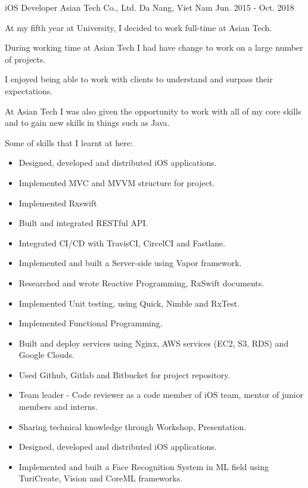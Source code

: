 \begin{cventries}
  \cventry
    {iOS Developer} %
    {Asian Tech Co., Ltd.} %
    {Da Nang, Viet Nam} %
    {Jun. 2015 - Oct. 2018} %
    {
      \begin{cvitems} %
        \item {At my fifth year at University, I decided to work full-time at Asian Tech.}
        \item {During working time at Asian Tech I had have change to work on a large number of projects.}
        \item {I enjoyed being able to work with clients to understand and surpass their expectations.}
        \item {At Asian Tech I was also given the opportunity to work with all of my core skills and to gain new skills in things such as Java.}
        \item {Some of skills that I learnt at here:}
          \begin{itemize}
            \item Designed, developed and distributed iOS applications.
            \item Implemented MVC and MVVM structure for project.
            \item Implemented Rxswift
            \item Built and integrated RESTful API.
            \item Integrated CI/CD with TravisCI, CircelCI and Fastlane.
            \item Implemented and built a Server-side using Vapor framework.
            \item Researched and wrote Reactive Programming, RxSwift documents.
            \item Implemented Unit testing, using Quick, Nimble and RxTest.
            \item Implemented Functional Programming.
            \item Built and deploy services using Nginx, AWS services (EC2, S3, RDS) and Google Clouds.
            \item Used Github, Gitlab and Bitbucket for project repository.
            \item Team leader - Code reviewer as a code member of iOS team, mentor of junior members and interns.
            \item Sharing technical knowledge through Workshop, Presentation.
            \item Designed, developed and distributed iOS applications.
            \item Implemented and built a Face Recognition System in ML field using TuriCreate, Vision and CoreML frameworks.
          \end{itemize}
      \end{cvitems}
    }


\end{cventries}
